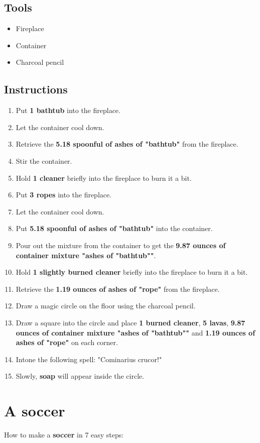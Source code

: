 \documentclass{article}
\begin{document}
\subsection{Tools}\begin{itemize}
\item 
Fireplace
\item 
Container
\item 
Charcoal pencil
\end{itemize}
\subsection{Instructions}\begin{enumerate}
\item 
Put \textbf{1 bathtub} into the fireplace.
\item 
Let the container cool down.
\item 
Retrieve the \textbf{5.18 spoonful of ashes of "bathtub"} from the fireplace.
\item 
Stir the container.
\item 
Hold \textbf{1 cleaner} briefly into the fireplace to burn it a bit.
\item 
Put \textbf{3 ropes} into the fireplace.
\item 
Let the container cool down.
\item 
Put \textbf{5.18 spoonful of ashes of "bathtub"} into the container.
\item 
Pour out the mixture from the container to get the \textbf{9.87 ounces of container mixture "ashes of "bathtub""}.
\item 
Hold \textbf{1 slightly burned cleaner} briefly into the fireplace to burn it a bit.
\item 
Retrieve the \textbf{1.19 ounces of ashes of "rope"} from the fireplace.
\item 
Draw a magic circle on the floor using the charcoal pencil.
\item 
Draw a square into the circle and place \textbf{1 burned cleaner}, \textbf{5 lavas}, \textbf{9.87 ounces of container mixture "ashes of "bathtub""} and \textbf{1.19 ounces of ashes of "rope"} on each corner.
\item 
Intone the following spell: "Cominarius crucor!"
\item 
Slowly, \textbf{soap} will appear inside the circle.
\end{enumerate}
\newpage
\section{A soccer}How to make a \textbf{soccer} in 7 easy steps:
\end{document}

